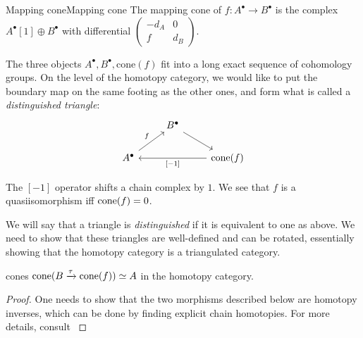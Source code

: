 \begin{definition}{Mapping cone}{Mapping cone}
    The mapping cone of $f:A^\bullet\to B^\bullet$ is the complex $A^\bullet[1]\oplus B^\bullet$ with differential $\begin{pmatrix} -d_A & 0 \\ f & d_B \end{pmatrix}$.
\end{definition}

The three objects $A^\bullet, B^\bullet, \mathrm{cone}(f)$ fit into a long exact sequence of cohomology groups. On the level of the homotopy category, we would like to put the boundary map on the same footing as the other ones, and form what is called a \emph{distinguished triangle}: \[\begin{tikzcd}
    & B^\bullet \arrow[rd] &                                       \\
A^\bullet \arrow[ru, "f"] &                      & \mathrm{cone}(f) \arrow[ll, "{[-1]}"]
\end{tikzcd}\]

The $[-1]$ operator shifts a chain complex by $1$. We see that $f$ is a quasiisomorphism iff $\operatorname{cone}(f)=0$. 

We will say that a triangle is \emph{distinguished} if it is equivalent to one as above. We need to show that these triangles are well-defined and can be rotated, essentially showing that the homotopy category is a triangulated category.

\begin{proposition}{}{cones}
    $\operatorname{cone}(B\xrightarrow\tau\operatorname{cone}(f))\simeq A$ in the homotopy category.
\end{proposition}

\begin{proof}
    One needs to show that the two morphisms described below are homotopy inverses, which can be done by finding explicit chain homotopies. For more details, consult \cite[\S4]{gelfand_methods_2003}
\end{proof}


